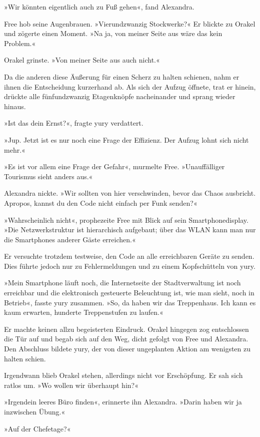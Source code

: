 »Wir könnten eigentlich auch zu Fuß gehen«, fand Alexandra.

Free hob seine Augenbrauen. »Vierundzwanzig Stockwerke?« Er blickte zu Orakel und zögerte einen Moment. »Na ja, von meiner Seite aus wäre das kein Problem.«

Orakel grinste. »Von meiner Seite aus auch nicht.«

Da die anderen diese Äußerung für einen Scherz zu halten schienen, nahm er ihnen die Entscheidung kurzerhand ab. Als sich der Aufzug öffnete, trat er hinein, drückte alle fünfundzwanzig Etagenknöpfe nacheinander und sprang wieder hinaus.

»Ist das dein Ernst?«, fragte yury verdattert.

»Jup. Jetzt ist es nur noch eine Frage der Effizienz. Der Aufzug lohnt sich nicht mehr.«

»Es ist vor allem eine Frage der Gefahr«, murmelte Free. »Unauffälliger Tourismus sieht anders aus.«

Alexandra nickte. »Wir sollten von hier verschwinden, bevor das Chaos ausbricht. Apropos, kannst du den Code nicht einfach per Funk senden?«

»Wahrscheinlich nicht«, prophezeite Free mit Blick auf sein Smartphonedisplay. »Die Netzwerkstruktur ist hierarchisch aufgebaut; über das WLAN kann man nur die Smartphones anderer Gäste erreichen.«

Er versuchte trotzdem testweise, den Code an alle erreichbaren Geräte zu senden. Dies führte jedoch nur zu Fehlermeldungen und zu einem Kopfschütteln von yury.

»Mein Smartphone läuft noch, die Internetseite der Stadtverwaltung ist noch erreichbar und die elektronisch gesteuerte Beleuchtung ist, wie man sieht, noch in Betrieb«, fasste yury zusammen. »So, da haben wir das Treppenhaus. Ich kann es kaum erwarten, hunderte Treppenstufen zu laufen.«

Er machte keinen allzu begeisterten Eindruck. Orakel hingegen zog entschlossen die Tür auf und begab sich auf den Weg, dicht gefolgt von Free und Alexandra. Den Abschluss bildete yury, der von dieser ungeplanten Aktion am wenigsten zu halten schien.

Irgendwann blieb Orakel stehen, allerdings nicht vor Erschöpfung. Er sah sich ratlos um. »Wo wollen wir überhaupt hin?«

»Irgendein leeres Büro finden«, erinnerte ihn Alexandra. »Darin haben wir ja inzwischen Übung.«

»Auf der Chefetage?«

